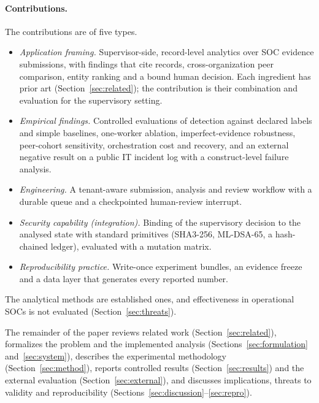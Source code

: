 \paragraph{Contributions.} The contributions are of five types.
\begin{itemize}
\item \emph{Application framing.} Supervisor-side,
record-level analytics over SOC evidence submissions, with findings that cite
records, cross-organization peer comparison, entity ranking and a bound human
decision. Each ingredient has prior art (Section~\ref{sec:related}); the contribution
is their combination and evaluation for the supervisory setting.
\item \emph{Empirical findings.} Controlled evaluations of detection against declared
labels and simple baselines, one-worker ablation, imperfect-evidence robustness,
peer-cohort sensitivity, orchestration cost and recovery, and an external negative
result on a public IT incident log with a construct-level failure analysis.
\item \emph{Engineering.} A tenant-aware submission, analysis and review workflow with
a durable queue and a checkpointed human-review interrupt.
\item \emph{Security capability (integration).} Binding of the supervisory decision to
the analysed state with standard primitives (SHA3-256, ML-DSA-65, a hash-chained
ledger), evaluated with a mutation matrix.
\item \emph{Reproducibility practice.} Write-once experiment bundles, an evidence
freeze and a data layer that generates every reported number.
\end{itemize}
The analytical methods are established ones, and effectiveness in operational SOCs
is not evaluated (Section~\ref{sec:threats}).

The remainder of the paper reviews related work (Section~\ref{sec:related}), formalizes
the problem and the implemented analysis (Sections~\ref{sec:formulation}
and~\ref{sec:system}), describes the experimental methodology
(Section~\ref{sec:method}), reports controlled results (Section~\ref{sec:results}) and
the external evaluation (Section~\ref{sec:external}), and discusses implications,
threats to validity and reproducibility (Sections~\ref{sec:discussion}--\ref{sec:repro}).
